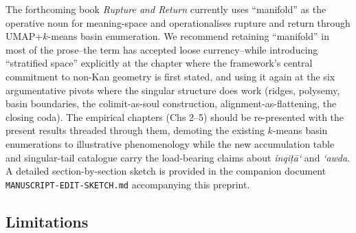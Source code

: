 \documentclass[11pt,a4paper]{article}
\theoremstyle{definition}
\begin{document}
The forthcoming book \emph{Rupture and Return} \cite{poernomo-rr2026}
currently uses ``manifold'' as the operative noun for meaning-space and
operationalises rupture and return through UMAP+$k$-means basin
enumeration. We recommend retaining ``manifold'' in most of the
prose--the term has accepted loose currency--while introducing
``stratified space'' explicitly at the chapter where the framework's
central commitment to non-Kan geometry is first stated, and using it
again at the six argumentative pivots where the singular structure
does work (ridges, polysemy, basin boundaries, the colimit-as-soul
construction, alignment-as-flattening, the closing coda). The empirical
chapters (Chs 2--5) should be re-presented with the present results
threaded through them, demoting the existing $k$-means basin
enumerations to illustrative phenomenology while the new accumulation
table and singular-tail catalogue carry the load-bearing claims about
\emph{inqi\d{t}\=a`} and \emph{`awda}. A detailed section-by-section
sketch is provided in the companion document
\texttt{MANUSCRIPT-EDIT-SKETCH.md} accompanying this preprint.

\subsection{Limitations}
\end{document}
